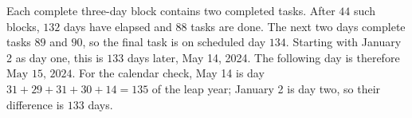 Each complete three-day block contains two completed tasks. After $44$ such blocks, $132$ days have elapsed and $88$ tasks are done. The next two days complete tasks $89$ and $90$, so the final task is on scheduled day $134$. Starting with January 2 as day one, this is $133$ days later, May 14, 2024. The following day is therefore $\boxed{\text{May 15, 2024}}$.
For the calendar check, May 14 is day $31+29+31+30+14=135$ of the leap year; January 2 is day two, so their difference is $133$ days.
